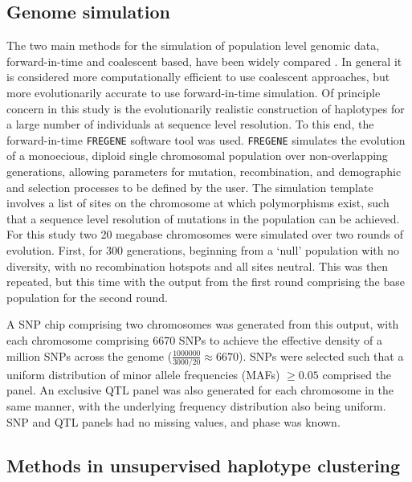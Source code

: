 \subsection{Genome simulation}\label{sec:genome_simulation}

The two main methods for the simulation of population level genomic data, forward-in-time and coalescent based, have been widely compared \citep{Carvajal-Rodriguez2008, Cyran2008, DiVentura2006}. In general it is considered more computationally efficient to use coalescent approaches, but more evolutionarily accurate to use forward-in-time simulation. Of principle concern in this study is the evolutionarily realistic construction of haplotypes for a large number of individuals at sequence level resolution. To this end, the forward-in-time {\tt FREGENE} software tool \citep{Chadeau-hyam2008, Hoggart2007} was used. {\tt FREGENE} simulates the evolution of a monoecious, diploid single chromosomal population over non-overlapping generations, allowing parameters for mutation, recombination, and demographic and selection processes to be defined by the user. The simulation template involves a list of sites on the chromosome at which polymorphisms exist, such that a sequence level resolution of mutations in the population can be achieved. For this study two 20 megabase chromosomes were simulated over two rounds of evolution. First, for 300 generations, beginning from a `null' population with no diversity, with no recombination hotspots and all sites neutral. This was then repeated, but this time with the output from the first round comprising the base population for the second round.

A SNP chip comprising two chromosomes was generated from this output, with each chromosome comprising 6670 SNPs to achieve the effective density of a million SNPs across the genome ($\frac{1000000}{3000/20} \approx 6670$). SNPs were selected such that a uniform distribution of minor allele frequencies (MAFs) $\geq0.05$ comprised the panel. An exclusive QTL panel was also generated for each chromosome in the same manner, with the underlying frequency distribution also being uniform. SNP and QTL panels had no missing values, and phase was known.


\subsection{Methods in unsupervised haplotype clustering} \label{sec:methods_unsupervised}

